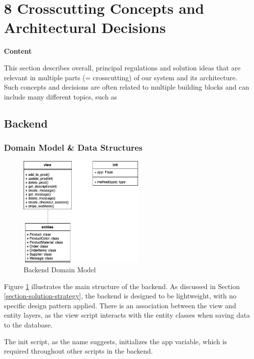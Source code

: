 \hypertarget{section-concepts}{%
\section{8 Crosscutting Concepts and Architectural Decisions}\label{section-concepts}}

\textbf{Content}

This section describes overall, principal regulations and solution ideas that are relevant in multiple parts (= crosscutting) of our system and its architecture. Such concepts and decisions are often related to multiple building blocks and can include many different topics, such as

\subsection{Backend}
\subsubsection{Domain Model \& Data Structures}

\begin{figure}
    \centering
    \includegraphics[width=0.55\textwidth]{images/uml_backend.png}
    \caption{Backend Domain Model}
    \label{fig:doman-model-backend}
\end{figure}

Figure \ref{fig:doman-model-backend} illustrates the main structure of the backend. As discussed in Section \ref{section-solution-strategy}, the backend is designed to be lightweight, with no specific design pattern applied. There is an association between the view and entity layers, as the view script interacts with the entity classes when saving data to the database.

The init script, as the name suggests, initializes the app variable, which is required throughout other scripts in the backend.

